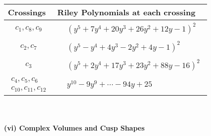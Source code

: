 \documentclass[1p]{elsarticle_modified}
\theoremstyle{definition}
\begin{document}
\begin{tabular}{m{50pt}|m{274pt}}
Crossings & \hspace{64pt}Riley Polynomials at each crossing \\
\hline $$\begin{aligned}c_{1},c_{8},c_{9}\end{aligned}$$&$\begin{aligned}
&(y^5+7 y^4+20 y^3+26 y^2+12 y-1)^2
\end{aligned}$\\
\hline $$\begin{aligned}c_{2},c_{7}\end{aligned}$$&$\begin{aligned}
&(y^5- y^4+4 y^3-2 y^2+4 y-1)^2
\end{aligned}$\\
\hline $$\begin{aligned}c_{3}\end{aligned}$$&$\begin{aligned}
&(y^5+2 y^4+17 y^3+23 y^2+88 y-16)^2
\end{aligned}$\\
\hline $$\begin{aligned}c_{4},c_{5},c_{6}\\c_{10},c_{11},c_{12}\end{aligned}$$&$\begin{aligned}
&y^{10}-9 y^9+\cdots-94 y+25
\end{aligned}$\\
\hline
\end{tabular}\\~\\
\newpage\flushleft \textbf{(vi) Complex Volumes and Cusp Shapes}
\end{document}
